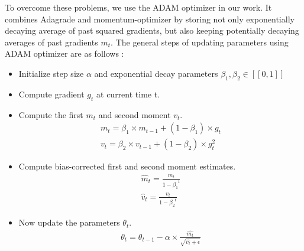 \begin{itemize}
To overcome these problems, we use the ADAM optimizer in our work. It combines Adagrade \cite{Adagrade} and momentum-optimizer\cite{momentum} by storing not only exponentially decaying average of past squared gradients, but also keeping potentially decaying averages of past gradients $m_t$. The general steps of updating parameters using ADAM optimizer are as follows :
\begin{itemize}
    \item Initialize step size $\alpha$ and exponential decay parameters $\beta_1, \beta_2  \in [\![ 0,1]\!]$
    \item Compute gradient $g_t$ at current time t.
    \item Compute the first $m_t$ and second moment $v_t$.
    \begin{equation}\label{eq:moment}
        \begin{aligned}
            m_t = \beta_1 \times m_{t-1} + \left ( 1 - \beta_1 \right ) \times g_t \\
            v_t= \beta_2 \times v_{t-1} + \left ( 1 - \beta_2 \right ) \times g_t^{2}
        \end{aligned}
    \end{equation}
    \item Compute bias-corrected first  and second moment estimates.
     \begin{equation}\label{eq:moment2}
        \begin{aligned}
            \widehat{m}_t = \frac{m_t}{1-{\beta_1}^{t}} \\
            \widehat{v}_t = \frac{v_t}{1-{\beta_2}^{t}}
        \end{aligned}
    \end{equation}
    \item Now update the parameters $\theta_t$.
    \begin{equation}\label{eq:moment3}
        \begin{aligned}
            \theta_t =\theta_{t-1} - \alpha \times \frac{\widehat{m_{t}}}{\sqrt{\widehat{v_t} + \epsilon }}
        \end{aligned}
    \end{equation}
\end{itemize}

\end{itemize}
 